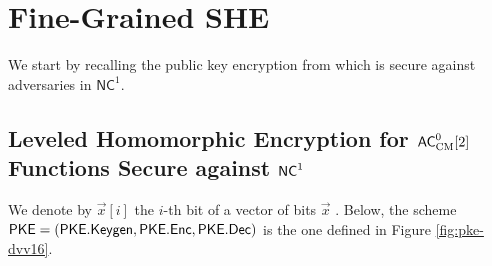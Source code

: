 \section{Fine-Grained SHE}
\label{sec:he}
\label{sec:HE}

We start by recalling the public key encryption from \cite{fgcrypto} which is 
secure against adversaries in $\mathsf{NC}^1$. 


 
\subsection{Leveled Homomorphic Encryption for ${\mathsf{AC}}^0_{\text{CM}}[2]$ Functions Secure against ${\mathsf{NC}}^1$}
\label{sec:leveled-he-simple}
 

We denote by $\vec{x}[i]$ the $i$-th bit of a vector of bits $\vec{x}$ . Below, the scheme $\mathsf{PKE} = (\mathsf{PKE.Keygen},\mathsf{PKE.Enc}, \mathsf{PKE.Dec})$ is the one defined in Figure \ref{fig:pke-dvv16}.

